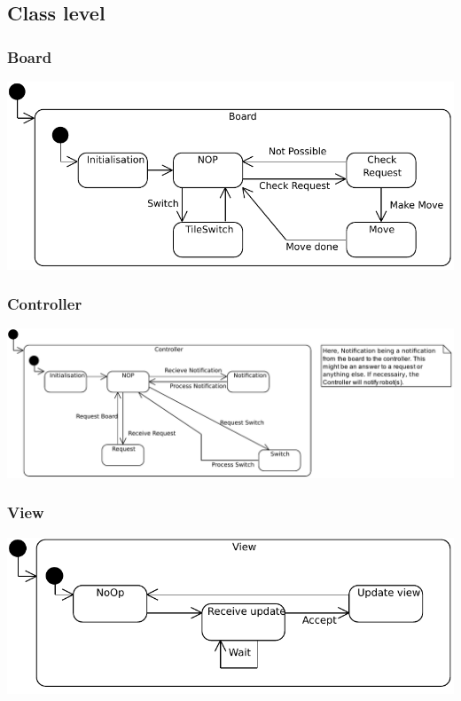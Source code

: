 

\subsection{Class level}
	\subsubsection{Board} 
		\includegraphics[width=\linewidth]{statecharts/board.pdf}
	\subsubsection{Controller}
		\includegraphics[width=\linewidth]{statecharts/controller.pdf}
	\subsubsection{View}
		\includegraphics[width=\linewidth]{statecharts/view.pdf}
